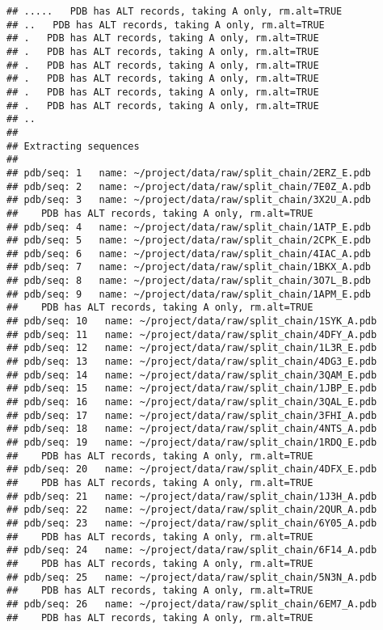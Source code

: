\documentclass[
]{article}
\begin{document}
\begin{verbatim}
## .....   PDB has ALT records, taking A only, rm.alt=TRUE
## ..   PDB has ALT records, taking A only, rm.alt=TRUE
## .   PDB has ALT records, taking A only, rm.alt=TRUE
## .   PDB has ALT records, taking A only, rm.alt=TRUE
## .   PDB has ALT records, taking A only, rm.alt=TRUE
## .   PDB has ALT records, taking A only, rm.alt=TRUE
## .   PDB has ALT records, taking A only, rm.alt=TRUE
## .   PDB has ALT records, taking A only, rm.alt=TRUE
## ..
## 
## Extracting sequences
## 
## pdb/seq: 1   name: ~/project/data/raw/split_chain/2ERZ_E.pdb 
## pdb/seq: 2   name: ~/project/data/raw/split_chain/7E0Z_A.pdb 
## pdb/seq: 3   name: ~/project/data/raw/split_chain/3X2U_A.pdb 
##    PDB has ALT records, taking A only, rm.alt=TRUE
## pdb/seq: 4   name: ~/project/data/raw/split_chain/1ATP_E.pdb 
## pdb/seq: 5   name: ~/project/data/raw/split_chain/2CPK_E.pdb 
## pdb/seq: 6   name: ~/project/data/raw/split_chain/4IAC_A.pdb 
## pdb/seq: 7   name: ~/project/data/raw/split_chain/1BKX_A.pdb 
## pdb/seq: 8   name: ~/project/data/raw/split_chain/3O7L_B.pdb 
## pdb/seq: 9   name: ~/project/data/raw/split_chain/1APM_E.pdb 
##    PDB has ALT records, taking A only, rm.alt=TRUE
## pdb/seq: 10   name: ~/project/data/raw/split_chain/1SYK_A.pdb 
## pdb/seq: 11   name: ~/project/data/raw/split_chain/4DFY_A.pdb 
## pdb/seq: 12   name: ~/project/data/raw/split_chain/1L3R_E.pdb 
## pdb/seq: 13   name: ~/project/data/raw/split_chain/4DG3_E.pdb 
## pdb/seq: 14   name: ~/project/data/raw/split_chain/3QAM_E.pdb 
## pdb/seq: 15   name: ~/project/data/raw/split_chain/1JBP_E.pdb 
## pdb/seq: 16   name: ~/project/data/raw/split_chain/3QAL_E.pdb 
## pdb/seq: 17   name: ~/project/data/raw/split_chain/3FHI_A.pdb 
## pdb/seq: 18   name: ~/project/data/raw/split_chain/4NTS_A.pdb 
## pdb/seq: 19   name: ~/project/data/raw/split_chain/1RDQ_E.pdb 
##    PDB has ALT records, taking A only, rm.alt=TRUE
## pdb/seq: 20   name: ~/project/data/raw/split_chain/4DFX_E.pdb 
##    PDB has ALT records, taking A only, rm.alt=TRUE
## pdb/seq: 21   name: ~/project/data/raw/split_chain/1J3H_A.pdb 
## pdb/seq: 22   name: ~/project/data/raw/split_chain/2QUR_A.pdb 
## pdb/seq: 23   name: ~/project/data/raw/split_chain/6Y05_A.pdb 
##    PDB has ALT records, taking A only, rm.alt=TRUE
## pdb/seq: 24   name: ~/project/data/raw/split_chain/6F14_A.pdb 
##    PDB has ALT records, taking A only, rm.alt=TRUE
## pdb/seq: 25   name: ~/project/data/raw/split_chain/5N3N_A.pdb 
##    PDB has ALT records, taking A only, rm.alt=TRUE
## pdb/seq: 26   name: ~/project/data/raw/split_chain/6EM7_A.pdb 
##    PDB has ALT records, taking A only, rm.alt=TRUE

\end{verbatim}
\end{document}
